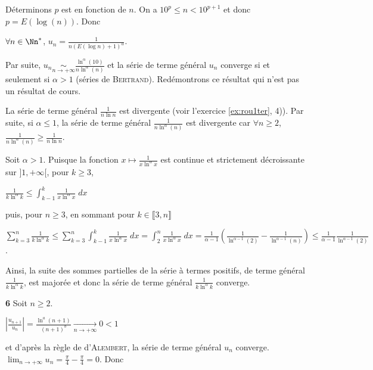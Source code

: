 {{Déterminons $p$ est  en fonction de $n$. On a $10^p\leqslant n <10^{p+1}$ et donc $p=E\left(\log(n)\right)$. Donc

\begin{center}
$\forall n\in\Nn^*$, $u_n=\frac{1}{n(E(\log n)+1)^\alpha}$.
\end{center}

Par suite, $u_n\underset{n\rightarrow+\infty}{\sim}\frac{\ln^\alpha(10)}{n\ln^\alpha(n)}$ et la série de terme général $u_n$ converge si et seulement si $\alpha> 1$ (séries de \textsc{Bertrand}). Redémontrons ce résultat qui n'est pas un résultat de cours.

La série de terme général $\frac{1}{n\ln n}$ est divergente (voir l'exercice \ref{ex:rou1ter}, 4)). Par suite, si $\alpha\leqslant1$, la série de terme général $\frac{1}{n\ln^\alpha(n)}$ est divergente car $\forall n\geqslant2$, $\frac{1}{n\ln^\alpha(n)}\geqslant\frac{1}{n\ln n}$.

Soit $\alpha>1$. Puisque la fonction $x\mapsto\frac{1}{x\ln^\alpha x}$ est continue et strictement décroissante sur $]1,+\infty[$, pour $k\geqslant3$,

\begin{center}
$\frac{1}{k\ln^\alpha k}\leqslant\int_{k-1}^{k}\frac{1}{x\ln^\alpha x}\;dx$
\end{center}

puis, pour $n\geqslant3$, en sommant pour $k\in\llbracket3,n\rrbracket$

\begin{center}
$\sum_{k=3}^{n}\frac{1}{k\ln^\alpha k}\leqslant\sum_{k=3}^{n}\int_{k-1}^{k}\frac{1}{x\ln^\alpha x}\;dx=\int_{2}^{n}\frac{1}{x\ln^\alpha x}\;dx=\frac{1}{\alpha-1}\left(\frac{1}{\ln^{\alpha-1}(2)}-\frac{1}{\ln^{\alpha-1}(n)}\right)\leqslant\frac{1}{\alpha-1}\frac{1}{\ln^{\alpha-1}(2)}$.
\end{center}

Ainsi, la suite des sommes partielles de la série à termes positifs, de terme général $\frac{1}{k\ln^\alpha k}$, est majorée et donc la série de terme général $\frac{1}{k\ln^\alpha k}$ converge.

\textbf{6} Soit $n\geqslant2$.

\begin{center}
$\left|\frac{u_{n+1}}{u_n}\right|=\frac{\ln^a(n+1)}{(n+1)^b}\underset{n\rightarrow+\infty}{\rightarrow}0 < 1$
\end{center}

et d'après la règle de d'\textsc{Alembert}, la série de terme général $u_n$ converge.
$\lim_{n \rightarrow +\infty}u_n=\frac{\pi}{4}-\frac{\pi}{4}= 0$. Donc

}}
